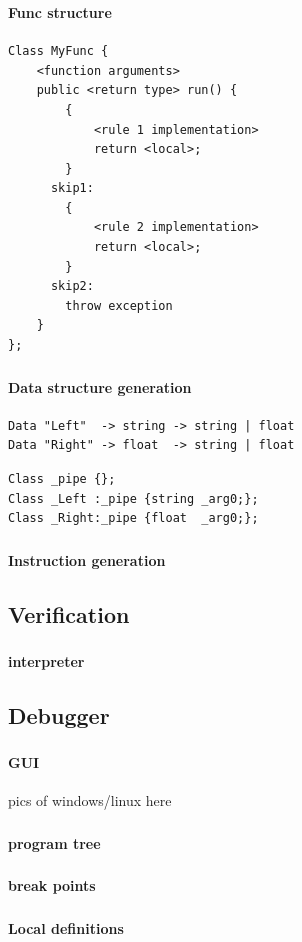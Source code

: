 \begin{frame}[fragile]
    \frametitle{\subsecname}
    \framesubtitle{Func structure}
    \begin{lstlisting}
Class MyFunc {
    <function arguments>
    public <return type> run() {
        {
            <rule 1 implementation>
            return <local>;
        }
      skip1:
        {
            <rule 2 implementation>
            return <local>;
        }
      skip2:
        throw exception
    }
};
    \end{lstlisting}
\end{frame}

\begin{frame}[fragile]
    \frametitle{\subsecname}
    \framesubtitle{Data structure generation}
    \begin{lstlisting}
Data "Left"  -> string -> string | float
Data "Right" -> float  -> string | float
    \end{lstlisting}
    
    \begin{lstlisting}
Class _pipe {};
Class _Left :_pipe {string _arg0;};
Class _Right:_pipe {float  _arg0;};
    \end{lstlisting}
\end{frame}

\begin{frame}
    \frametitle{\subsecname}
    \framesubtitle{Instruction generation}
\end{frame}

\subsection{Verification}
\begin{frame}
    \frametitle{\subsecname}
    \framesubtitle{interpreter}
\end{frame}

\subsection{Debugger}

\begin{frame}
    \frametitle{\subsecname}
    \framesubtitle{GUI}
    pics of windows/linux here
\end{frame}

\begin{frame}
    \frametitle{\subsecname}
    \framesubtitle{program tree}
\end{frame}

\begin{frame}
    \frametitle{\subsecname}
    \framesubtitle{break points}
\end{frame}

\begin{frame}
    \frametitle{\subsecname}
    \framesubtitle{Local definitions}
\end{frame}

